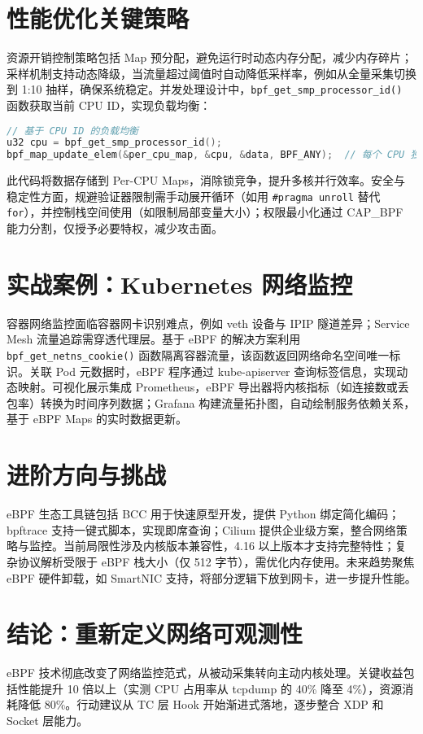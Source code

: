 \chapter{性能优化关键策略}
资源开销控制策略包括 Map 预分配，避免运行时动态内存分配，减少内存碎片；采样机制支持动态降级，当流量超过阈值时自动降低采样率，例如从全量采集切换到 1:10 抽样，确保系统稳定。并发处理设计中，\texttt{bpf\_{}get\_{}smp\_{}processor\_{}id()} 函数获取当前 CPU ID，实现负载均衡：\par
\begin{lstlisting}[language=c]
// 基于 CPU ID 的负载均衡
u32 cpu = bpf_get_smp_processor_id();
bpf_map_update_elem(&per_cpu_map, &cpu, &data, BPF_ANY);  // 每个 CPU 独立 Map
\end{lstlisting}
此代码将数据存储到 Per-CPU Maps，消除锁竞争，提升多核并行效率。安全与稳定性方面，规避验证器限制需手动展开循环（如用 \texttt{\#{}pragma unroll} 替代 \texttt{for}），并控制栈空间使用（如限制局部变量大小）；权限最小化通过 CAP\_{}BPF 能力分割，仅授予必要特权，减少攻击面。\par
\chapter{实战案例：Kubernetes 网络监控}
容器网络监控面临容器网卡识别难点，例如 veth 设备与 IPIP 隧道差异；Service Mesh 流量追踪需穿透代理层。基于 eBPF 的解决方案利用 \texttt{bpf\_{}get\_{}netns\_{}cookie()} 函数隔离容器流量，该函数返回网络命名空间唯一标识。关联 Pod 元数据时，eBPF 程序通过 kube-apiserver 查询标签信息，实现动态映射。可视化展示集成 Prometheus，eBPF 导出器将内核指标（如连接数或丢包率）转换为时间序列数据；Grafana 构建流量拓扑图，自动绘制服务依赖关系，基于 eBPF Maps 的实时数据更新。\par
\chapter{进阶方向与挑战}
eBPF 生态工具链包括 BCC 用于快速原型开发，提供 Python 绑定简化编码；bpftrace 支持一键式脚本，实现即席查询；Cilium 提供企业级方案，整合网络策略与监控。当前局限性涉及内核版本兼容性，4.16 以上版本才支持完整特性；复杂协议解析受限于 eBPF 栈大小（仅 512 字节），需优化内存使用。未来趋势聚焦 eBPF 硬件卸载，如 SmartNIC 支持，将部分逻辑下放到网卡，进一步提升性能。\par
\chapter{结论：重新定义网络可观测性}
eBPF 技术彻底改变了网络监控范式，从被动采集转向主动内核处理。关键收益包括性能提升 10 倍以上（实测 CPU 占用率从 tcpdump 的 40\%{} 降至 4\%{}），资源消耗降低 80\%{}。行动建议从 TC 层 Hook 开始渐进式落地，逐步整合 XDP 和 Socket 层能力。\par
